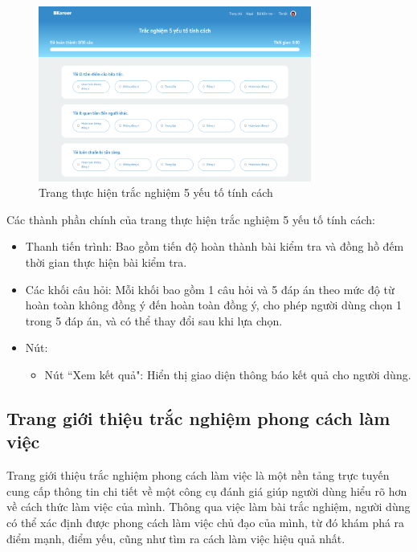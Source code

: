 \begin{figure}[H]
    \centering
    \includegraphics[width=0.8\textwidth]
    {images/chap5/fivePer.png}
    \vspace{0.5cm}
    \caption{Trang thực hiện trắc nghiệm 5 yếu tố tính cách}
\end{figure}

Các thành phần chính của trang thực hiện trắc nghiệm 5 yếu tố tính cách:
\begin{itemize}
    \item Thanh tiến trình: Bao gồm tiến độ hoàn thành bài kiểm tra và đồng hồ đếm thời gian thực hiện bài kiểm tra.
    \item Các khối câu hỏi: Mỗi khối bao gồm 1 câu hỏi và 5 đáp án theo mức độ từ hoàn toàn không đồng ý đến hoàn toàn đồng ý, cho phép người dùng chọn 1 trong 5 đáp án, và có thể thay đổi sau khi lựa chọn.
    \item Nút:
        \begin{itemize}
            \item Nút ``Xem kết quả": Hiển thị giao diện thông báo kết quả cho người dùng.
        \end{itemize}
\end{itemize}


\subsection{Trang giới thiệu trắc nghiệm phong cách làm việc}
Trang giới thiệu trắc nghiệm phong cách làm việc là một nền tảng trực tuyến cung cấp thông tin chi tiết về một công cụ đánh giá giúp người dùng hiểu rõ hơn về cách thức làm việc của mình. Thông qua việc làm bài trắc nghiệm, người dùng có thể xác định được phong cách làm việc chủ đạo của mình, từ đó khám phá ra điểm mạnh, điểm yếu, cũng như tìm ra cách làm việc hiệu quả nhất.

